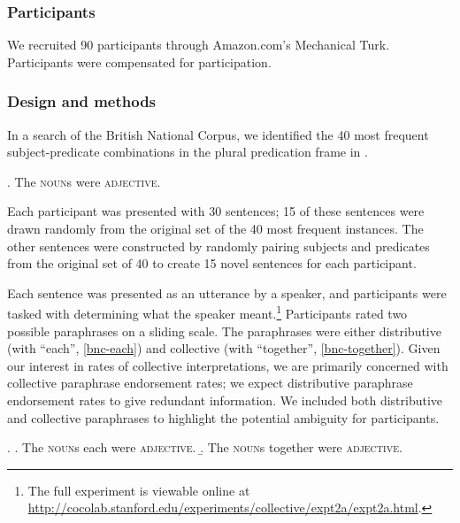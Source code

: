 \documentclass[linguex]{sp}
\newcommand{\ndg}[1]{\textcolor{Green}{[ndg: #1]}}
\newcommand{\gcs}[1]{\textcolor{blue}{[gcs: #1]}}
\begin{document}
\subsubsection{Participants}

We recruited 90 participants through Amazon.com's Mechanical Turk. Participants were compensated for participation.

\subsubsection{Design and methods}

In a search of the British National Corpus, we identified the 40 most frequent subject-predicate combinations in the plural predication frame in \Next.

\ex. The \textsc{noun}s were \textsc{adjective}.

Each participant was presented with 30 sentences; 15 of these sentences were drawn randomly 
from the original set of the 40 most frequent instances. The other sentences were constructed by randomly pairing subjects and predicates from the original set of 40 to create 15 novel sentences for each participant. 

Each sentence was presented as an utterance by a speaker, and participants were tasked with determining what the speaker meant.\footnote{The full experiment is viewable online at \url{http://cocolab.stanford.edu/experiments/collective/expt2a/expt2a.html}.} Participants rated two possible paraphrases on a sliding scale. The paraphrases were either distributive (with ``each'', \ref{bnc-each}) and collective (with ``together'', \ref{bnc-together}). Given our interest in rates of collective interpretations, we are primarily concerned with collective paraphrase endorsement rates; we expect distributive paraphrase endorsement rates to give redundant information.  We included both distributive and collective paraphrases to highlight the potential ambiguity for participants.

\ex. \a. The \textsc{noun}s each were \textsc{adjective}. \label{bnc-each}
\b. The \textsc{noun}s together were \textsc{adjective}. \label{bnc-together}
\end{document}
